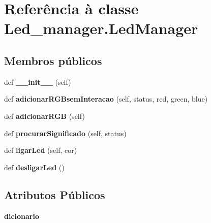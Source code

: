 \hypertarget{class_led__manager_1_1_led_manager}{}\section{Referência à classe Led\+\_\+manager.\+Led\+Manager}
\label{class_led__manager_1_1_led_manager}
\subsection*{Membros públicos}
\begin{DoxyCompactItemize}
\item 
def {\bfseries \+\_\+\+\_\+init\+\_\+\+\_\+} (self)\hypertarget{class_led__manager_1_1_led_manager_a28f9c755eb9ada094f3f114275c2883e}{}\label{class_led__manager_1_1_led_manager_a28f9c755eb9ada094f3f114275c2883e}

\item 
def {\bfseries adicionar\+R\+G\+Bsem\+Interacao} (self, status, red, green, blue)\hypertarget{class_led__manager_1_1_led_manager_ab477a7b68aede1c6b83cafc77e9687ed}{}\label{class_led__manager_1_1_led_manager_ab477a7b68aede1c6b83cafc77e9687ed}

\item 
def {\bfseries adicionar\+R\+GB} (self)\hypertarget{class_led__manager_1_1_led_manager_a4885b889ef9d8c96de4c2fdbff928da0}{}\label{class_led__manager_1_1_led_manager_a4885b889ef9d8c96de4c2fdbff928da0}

\item 
def {\bfseries procurar\+Significado} (self, status)\hypertarget{class_led__manager_1_1_led_manager_aa0cefc7c79e70ded055982a2eeb3c419}{}\label{class_led__manager_1_1_led_manager_aa0cefc7c79e70ded055982a2eeb3c419}

\item 
def {\bfseries ligar\+Led} (self, cor)\hypertarget{class_led__manager_1_1_led_manager_ae06a62c8976a92f5839efcee4f9164a4}{}\label{class_led__manager_1_1_led_manager_ae06a62c8976a92f5839efcee4f9164a4}

\item 
def {\bfseries desligar\+Led} ()\hypertarget{class_led__manager_1_1_led_manager_aee0287f597acdc605484eb9a17b09bb6}{}\label{class_led__manager_1_1_led_manager_aee0287f597acdc605484eb9a17b09bb6}

\end{DoxyCompactItemize}
\subsection*{Atributos Públicos}
\begin{DoxyCompactItemize}
\item 
{\bfseries dicionario}\hypertarget{class_led__manager_1_1_led_manager_a1712653f05086bd2c930553e8b728d1e}{}\label{class_led__manager_1_1_led_manager_a1712653f05086bd2c930553e8b728d1e}

\end{DoxyCompactItemize}
